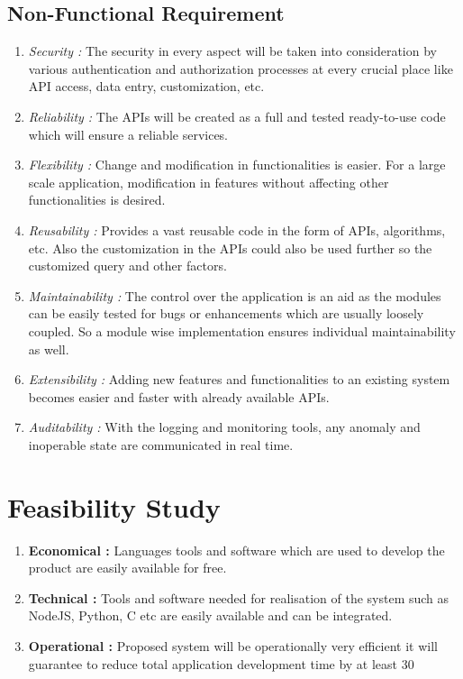\documentclass[a4paper,12pt]{report}
\begin{document}
    \subsection{Non-Functional Requirement}
    \begin{enumerate}
      \item {\emph {Security :} 
      The security in every aspect will be taken into consideration by various authentication and authorization processes at every crucial place like API access, data entry, customization, etc.      
      }
      \item {\emph {Reliability :} 
      The APIs will be created as a full and tested ready-to-use code which will ensure a reliable services.
      }
      \item {\emph {Flexibility :} 
      Change and modification in functionalities is easier. For a large scale application, modification in features without affecting other functionalities is desired.
      }
      \item {\emph {Reusability :} 
      Provides a vast reusable code in the form of APIs, algorithms, etc. Also the customization in the APIs could also be used further so the customized query and other factors.
      }
      \item {\emph {Maintainability :} 
      The control over the application is an aid as the modules can be easily tested for bugs or enhancements which are usually loosely coupled. So a module wise implementation ensures individual maintainability as well.
      }
      \item {\emph {Extensibility :} 
      Adding new features and functionalities to an existing system becomes easier and faster with already available APIs. 
      }
      \item {\emph {Auditability :} 
      With the logging and monitoring tools, any anomaly and inoperable state are communicated in real time.      
      }
    \end{enumerate}
    \section{Feasibility Study}    
    \begin{enumerate}
      \item {\textbf{Economical :} 
      Languages tools and software which are used to develop the product are easily available for free.
      }
      \item {\textbf{Technical :} 
      Tools and software needed for realisation of the system such as NodeJS, Python, C etc are easily available and can be integrated.
      }
      \item {\textbf{Operational :} 
      Proposed system will be operationally very efficient it will guarantee to reduce total application development time by at least 30%
      }
    \end{enumerate}
\end{document}
